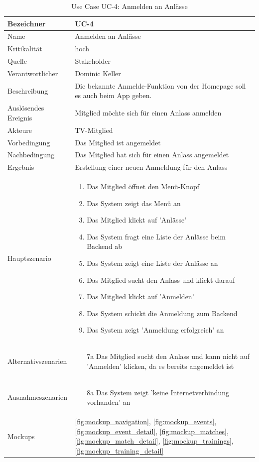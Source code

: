 \begin{table}[ht]
\centering
  \begin{tabular}{ l | p{10cm} }
	\hline
	\rowcolor{gray}
	Bezeichner		&	UC-4\\ \hline
	Name			&	Anmelden an Anlässe\\ \hline
	Kritikalität		&	hoch\\ \hline
	Quelle			&	Stakeholder\\ \hline
	Verantwortlicher	&	Dominic Keller\\ \hline
	Beschreibung	&	Die bekannte Anmelde-Funktion von der Homepage soll es auch beim App geben.\\ \hline
	Auslösendes Ereignis&	Mitglied möchte sich für einen Anlass anmelden\\ \hline
	Akteure		&	TV-Mitglied\\ \hline
	Vorbedingung	&	Das Mitglied ist angemeldet\\ \hline
	Nachbedingung	&	Das Mitglied hat sich für einen Anlass angemeldet\\ \hline
	Ergebnis		&	Erstellung einer neuen Anmeldung für den Anlass\\ \hline
	Hauptszenario	&	\begin{enumerate}
					\item Das Mitglied öffnet den Menü-Knopf
					\item Das System zeigt das Menü an
					\item Das Mitglied klickt auf 'Anlässe'
					\item Das System fragt eine Liste der Anlässe beim Backend ab
					\item Das System zeigt eine Liste der Anlässe an
					\item Das Mitglied sucht den Anlass und klickt darauf
					\item Das Mitglied klickt auf 'Anmelden'
					\item Das System schickt die Anmeldung zum Backend
					\item Das System zeigt 'Anmeldung erfolgreich' an
					\end{enumerate}
					\\ \hline
	Alternativszenarien	&	\begin{enumerate}
					\item[7a] Das Mitglied sucht den Anlass und kann nicht auf 'Anmelden' klicken, da es bereits angemeldet ist
					\end{enumerate}
					\\ \hline
	Ausnahmeszenarien&	\begin{enumerate}
					\item[8a] Das System zeigt 'keine Internetverbindung vorhanden' an
					\end{enumerate}
					\\ \hline
	Mockups	 	&	\ref{fig:mockup_navigation}, \ref{fig:mockup_events}, \ref{fig:mockup_event_detail},
					\ref{fig:mockup_matches}, \ref{fig:mockup_match_detail}, \ref{fig:mockup_trainings}, 
					\ref{fig:mockup_training_detail}
  \end{tabular}
   \caption{Use Case UC-4: Anmelden an Anlässe}\label{table:use_case_4}
\end{table}

